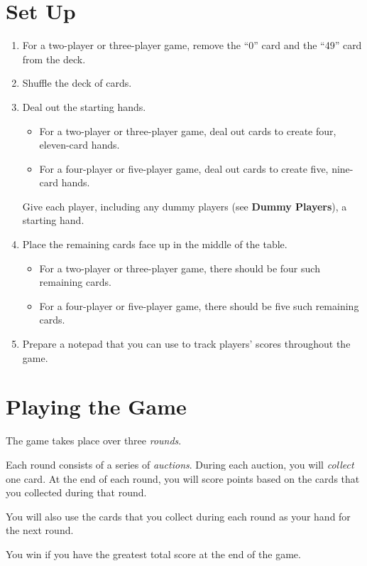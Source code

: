 \documentclass[a6paper, parskip=half, DIV=14, 10pt]{scrartcl}
\begin{document}
\section*{Set Up}
\begin{enumerate}[leftmargin=*]
	\item For a two-player or three-player game, remove the ``0'' card and the ``49'' card from the deck.
	\item Shuffle the deck of cards.
	\item Deal out the starting hands.
	\begin{itemize}[leftmargin=*]
		\item For a two-player or three-player game, deal out cards to create four, eleven-card hands.
		\item For a four-player or five-player game, deal out cards to create five, nine-card hands.
	\end{itemize}
	Give each player, including any dummy players (see \textbf{Dummy Players}), a starting hand.
	\item Place the remaining cards face up in the middle of the table.
	\begin{itemize}[leftmargin=*]
		\item For a two-player or three-player game, there should be four such remaining cards.
		\item For a four-player or five-player game, there should be five such remaining cards.
	\end{itemize}
	\item Prepare a notepad that you can use to track players' scores throughout the game.
\end{enumerate}

\newpage

\section*{Playing the Game}
The game takes place over three \emph{rounds}.

Each round consists of a series of \emph{auctions}.
During each auction, you will \emph{collect} one card.
At the end of each round, you will score points based on the cards that you collected during that round.

You will also use the cards that you collect during each round as your hand for the next round.

You win if you have the greatest total score at the end of the game.

\vfill
\end{document}
